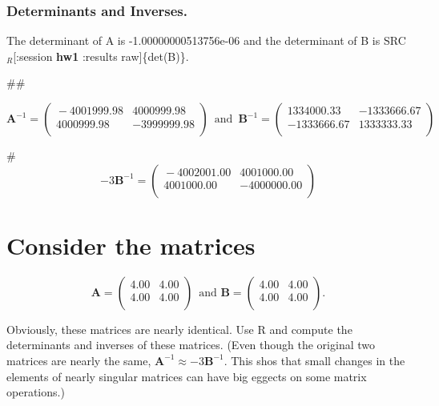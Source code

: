 \documentclass[11pt]{article}
\begin{document}
\subsubsection{Determinants and Inverses.}
\label{sec-3-1}


The determinant of A is -1.00000000513756e-06
and the determinant of B is SRC$_R$[:session \textbf{hw1} :results
raw]\{det(B)\}.

\#\#

$$\mathbf{A}^{-1} = 
\begin{pmatrix}{}
  -4001999.98 & 4000999.98 \\ 
  4000999.98 & -3999999.98 \\ 
  \end{pmatrix}\, \textrm{ and }\, 
\mathbf{B}^{-1}  =
\begin{pmatrix}{}
  1334000.33 & -1333666.67 \\ 
  -1333666.67 & 1333333.33 \\ 
  \end{pmatrix}$$

\#$$ -3\mathbf{B}^{-1} = 
\begin{pmatrix}{}
  -4002001.00 & 4001000.00 \\ 
  4001000.00 & -4000000.00 \\ 
  \end{pmatrix}$$
\section{Consider the matrices}
\label{sec-3}




$$\mathbf{A} = 
\begin{pmatrix}{}
  4.00 & 4.00 \\ 
  4.00 & 4.00 \\ 
  \end{pmatrix}\,\textrm{ and }\mathbf{B} =
\begin{pmatrix}{}
  4.00 & 4.00 \\ 
  4.00 & 4.00 \\ 
  \end{pmatrix}.$$

Obviously, these matrices are nearly identical. Use R and compute the
determinants and inverses of these matrices. (Even though the
original two matrices are nearly the same, $\mathbf{A}^{-1} \approx
-3\mathbf{B}^{-1}$. This shos that small changes in the elements of
nearly singular matrices can have big eggects on some matrix
operations.)
\end{document}
